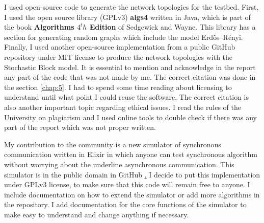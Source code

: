 I used open-source code to generate the network topologies for the testbed. First, I used the open source library (GPLv3) \textbf{algs4} written in Java, which is part of the book \textbf{Algorithms $4^th$ Edition} of Sedgewick and Wayne. This library has a section for generating random graphs which include the model  Erd\~os--R\'enyi. Finally, I used another open-source implementation from a public GitHub repository under MIT license to produce the network topologies with the Stochastic Block model. It is essential to mention and acknowledge in the report any part of the code that was not made by me. The correct citation was done in the section \ref{chap:5}. I had to spend some time reading about licensing to understand until what point I could reuse the software. The correct citation is also another important topic regarding ethical issues. I read the rules of the University on plagiarism and I used online tools to double check if there was any part of the report which was not proper written. 

My contribution to the community is a new simulator of synchronous communication written in Elixir in which anyone can test synchronous algorithm without worrying about the underline asynchronous communication.  This simulator is in the public domain in GitHub \href{https://github.com/mtileria/SymmetryBreaking}. I decide to put this implementation under GPLv3 license, to make sure that this code will remain free to anyone. I include documentation on how to extend the simulator or add more algorithms in the repository. I add documentation for the core functions of the simulator to make easy to understand and change anything if necessary. 

